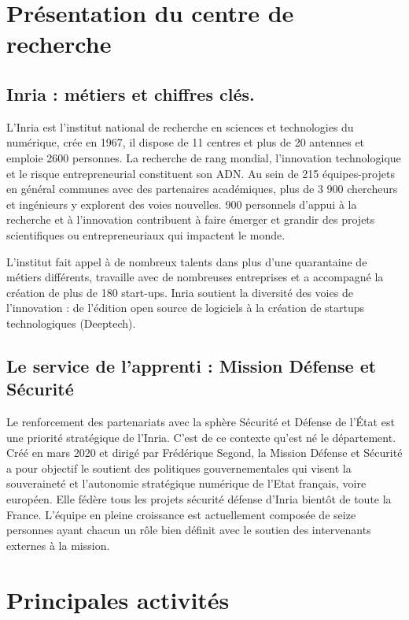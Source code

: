 \section{Présentation du centre de recherche}
\label{chap:sectionone}
\sloppy


\subsection{Inria : métiers et chiffres clés.}

L’Inria est l’institut national de recherche en sciences et technologies du numérique, crée en 1967, il dispose de 11 centres et plus de 20 antennes et emploie 2600 personnes. La recherche de rang mondial, l’innovation technologique et le risque entrepreneurial constituent son ADN.
Au sein de 215 équipes-projets en général communes avec des partenaires académiques, plus de 3 900 chercheurs et ingénieurs y explorent des voies nouvelles. 900 personnels d’appui à la recherche et à l’innovation contribuent à faire émerger et grandir des projets scientifiques ou entrepreneuriaux qui impactent le monde.

L’institut fait appel à de nombreux talents dans plus d’une quarantaine de métiers différents, travaille avec de nombreuses entreprises et a accompagné la création de plus de 180 start-ups.
Inria soutient la diversité des voies de l’innovation : de l’édition open source de logiciels à la création de startups technologiques (Deeptech).


\subsection{Le service de l’apprenti : Mission Défense et Sécurité}

Le renforcement des partenariats avec la sphère Sécurité et Défense de l’État est une priorité stratégique de l’Inria. C’est de ce contexte qu’est né le département. Créé en mars 2020 et dirigé par Frédérique Segond, la Mission Défense et Sécurité a pour objectif le soutient des politiques gouvernementales qui visent la souveraineté et l’autonomie stratégique numérique de l’Etat français, voire européen. Elle fédère tous les projets sécurité défense d’Inria bientôt de toute la France.
L’équipe en pleine croissance est actuellement composée de seize personnes ayant chacun un rôle bien définit avec le soutien des intervenants externes à la mission.

\section{Principales activités}


